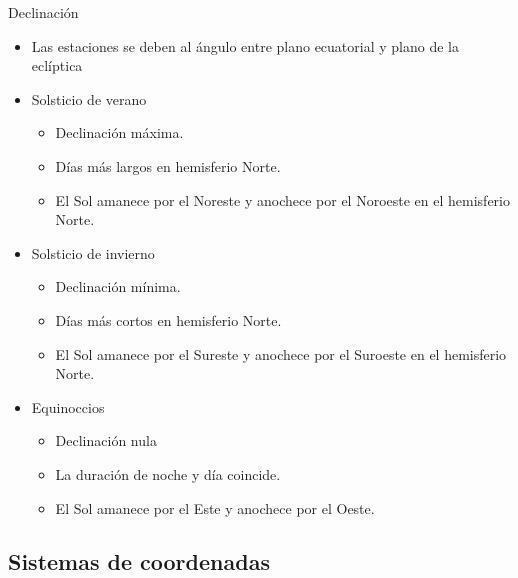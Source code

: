 \documentclass[xcolor={usenames,svgnames,dvipsnames}]{beamer}
\begin{document}
\begin{frame}[label=sec-1-1-8]{Declinación}
\begin{itemize}
\item Las estaciones se deben al ángulo entre plano ecuatorial y plano de
la eclíptica

\item \alert{Solsticio de verano}

\begin{itemize}
\item Declinación máxima.

\item Días más largos en hemisferio Norte.

\item El Sol amanece por el Noreste y anochece por el Noroeste en el
hemisferio Norte.
\end{itemize}

\item \alert{Solsticio de invierno}

\begin{itemize}
\item Declinación mínima.

\item Días más cortos en hemisferio Norte.

\item El Sol amanece por el Sureste y anochece por el Suroeste en el
hemisferio Norte.
\end{itemize}

\item \alert{Equinoccios}

\begin{itemize}
\item Declinación nula

\item La duración de noche y día coincide.

\item El Sol amanece por el Este y anochece por el Oeste.
\end{itemize}
\end{itemize}
\end{frame}

\subsection{Sistemas de coordenadas}
\label{sec-1-2}
\end{document}
